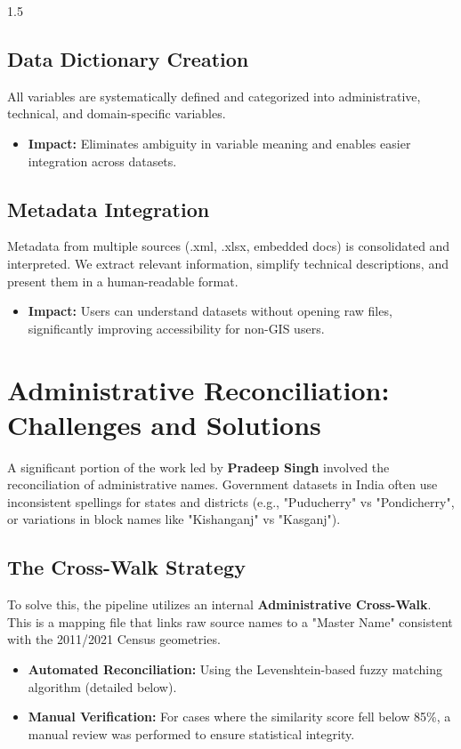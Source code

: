 \documentclass[12pt,a4paper]{report}
\begin{document}
\begin{spacing}{1.5}
\subsection{Data Dictionary Creation}
All variables are systematically defined and categorized into administrative, technical, and domain-specific variables.
\begin{itemize}
    \item \textbf{Impact:} Eliminates ambiguity in variable meaning and enables easier integration across datasets.
\end{itemize}

\subsection{Metadata Integration}
Metadata from multiple sources (.xml, .xlsx, embedded docs) is consolidated and interpreted. We extract relevant information, simplify technical descriptions, and present them in a human-readable format.
\begin{itemize}
    \item \textbf{Impact:} Users can understand datasets without opening raw files, significantly improving accessibility for non-GIS users.
\end{itemize}

\section{Administrative Reconciliation: Challenges and Solutions}
A significant portion of the work led by \textbf{Pradeep Singh} involved the reconciliation of administrative names. Government datasets in India often use inconsistent spellings for states and districts (e.g., "Puducherry" vs "Pondicherry", or variations in block names like "Kishanganj" vs "Kasganj").

\subsection{The Cross-Walk Strategy}
To solve this, the pipeline utilizes an internal \textbf{Administrative Cross-Walk}. This is a mapping file that links raw source names to a "Master Name" consistent with the 2011/2021 Census geometries.
\begin{itemize}
    \item \textbf{Automated Reconciliation:} Using the Levenshtein-based fuzzy matching algorithm (detailed below).
    \item \textbf{Manual Verification:} For cases where the similarity score fell below 85\%, a manual review was performed to ensure statistical integrity.
\end{itemize}


\end{spacing}
\end{document}
